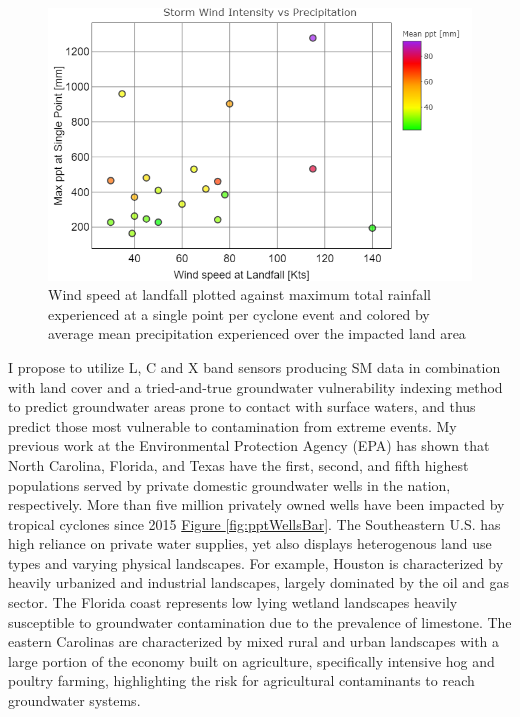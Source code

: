 \documentclass[
]{book}
\begin{document}
\begin{figure}
\includegraphics[width=1\linewidth]{img/stormPts} \caption{Wind speed at landfall plotted against maximum total rainfall experienced at a single point per cyclone event and colored by average mean precipitation experienced over the impacted land area }\label{fig:stormPts}
\end{figure}

I propose to utilize L, C and X band sensors producing SM data in combination with land cover and a tried-and-true groundwater vulnerability indexing method to predict groundwater areas prone to contact with surface waters, and thus predict those most vulnerable to contamination from extreme events. My previous work at the Environmental Protection Agency (EPA) has shown that North Carolina, Florida, and Texas have the first, second, and fifth highest populations served by private domestic groundwater wells in the nation, respectively\citep{murray2020}. More than five million privately owned wells have been impacted by tropical cyclones since 2015 \protect\hyperlink{fig:pptWellsBar}{Figure \ref{fig:pptWellsBar}}. The Southeastern U.S. has high reliance on private water supplies, yet also displays heterogenous land use types and varying physical landscapes. For example, Houston is characterized by heavily urbanized and industrial landscapes, largely dominated by the oil and gas sector. The Florida coast represents low lying wetland landscapes heavily susceptible to groundwater contamination due to the prevalence of limestone. The eastern Carolinas are characterized by mixed rural and urban landscapes with a large portion of the economy built on agriculture, specifically intensive hog and poultry farming, highlighting the risk for agricultural contaminants to reach groundwater systems.\\
\end{document}
